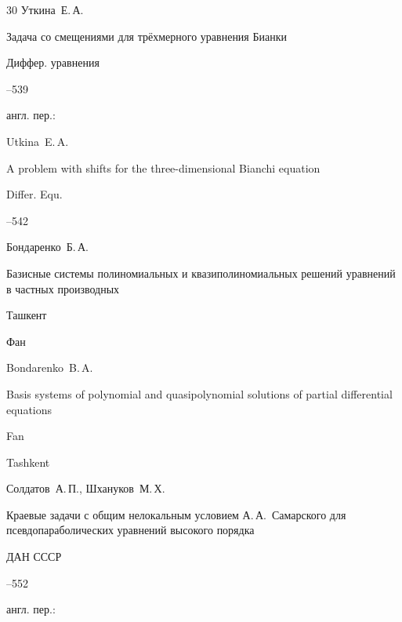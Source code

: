\begin{thebibliography}{30}
\by Уткина~Е.\,А.

\paper Задача со смещениями для трёхмерного уравнения Бианки

\jour Диффер. уравнения




--539

\transl англ. пер.:~

\by Utkina~E.\,A.

\paper A problem with shifts for the three-dimensional Bianchi equation

\jour Differ. Equ.




–542 




\by Бондаренко~Б.\,А.

\book Базисные системы полиномиальных и квазиполиномиальных решений уравнений в частных производных

\publaddr Ташкент

\publ Фан



\misctransl

\by Bondarenko~B.\,A. 

\book Basis systems of polynomial and quasipolynomial solutions of partial differential equations

\publ Fan

\publaddr Tashkent






\by Солдатов~А.\,П., Шхануков~М.\,Х.

\paper Краевые задачи с общим нелокальным условием А.\,А.~Самарского для псевдопараболических уравнений высокого порядка

\jour ДАН СССР




--552

\transl англ. пер.:~


\end{thebibliography}
